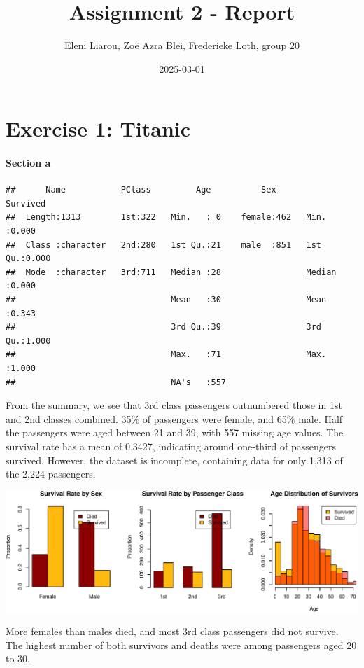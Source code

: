 \documentclass[
  11pt,
]{article}
\title{Assignment 2 - Report}
\author{Eleni Liarou, Zoë Azra Blei, Frederieke Loth, group 20}
\date{2025-03-01}
\begin{document}
\maketitle

\section{Exercise 1: Titanic}\label{exercise-1-titanic}

\paragraph{Section a}\label{section-a}

\begin{verbatim}
##      Name           PClass         Age          Sex         Survived    
##  Length:1313        1st:322   Min.   : 0    female:462   Min.   :0.000  
##  Class :character   2nd:280   1st Qu.:21    male  :851   1st Qu.:0.000  
##  Mode  :character   3rd:711   Median :28                 Median :0.000  
##                               Mean   :30                 Mean   :0.343  
##                               3rd Qu.:39                 3rd Qu.:1.000  
##                               Max.   :71                 Max.   :1.000  
##                               NA's   :557
\end{verbatim}

From the summary, we see that 3rd class passengers outnumbered those in
1st and 2nd classes combined. 35\% of passengers were female, and 65\%
male. Half the passengers were aged between 21 and 39, with 557 missing
age values. The survival rate has a mean of 0.3427, indicating around
one-third of passengers survived. However, the dataset is incomplete,
containing data for only 1,313 of the 2,224 passengers.

\includegraphics{ReportAssignment2_files/figure-latex/unnamed-chunk-2-1.pdf}

More females than males died, and most 3rd class passengers did not
survive. The highest number of both survivors and deaths were among
passengers aged 20 to 30.
\end{document}
